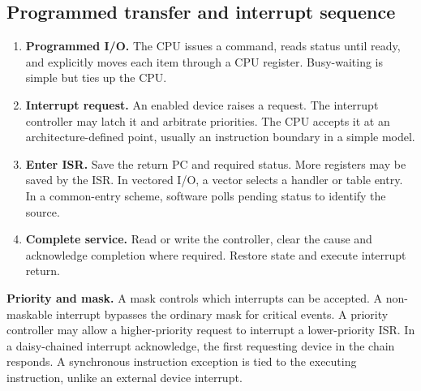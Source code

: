 \documentclass[12pt,a4paper]{article}
\begin{document}
\subsection{Programmed transfer and interrupt sequence}
\begin{enumerate}[leftmargin=*,itemsep=3pt]
\item \textbf{Programmed I/O.} The CPU issues a command, reads status until ready, and explicitly moves each item through a CPU register. Busy-waiting is simple but ties up the CPU.
\item \textbf{Interrupt request.} An enabled device raises a request. The interrupt controller may latch it and arbitrate priorities. The CPU accepts it at an architecture-defined point, usually an instruction boundary in a simple model.
\item \textbf{Enter ISR.} Save the return PC and required status. More registers may be saved by the ISR. In vectored I/O, a vector selects a handler or table entry. In a common-entry scheme, software polls pending status to identify the source.
\item \textbf{Complete service.} Read or write the controller, clear the cause and acknowledge completion where required. Restore state and execute interrupt return.
\end{enumerate}
\textbf{Priority and mask.} A mask controls which interrupts can be accepted. A non-maskable interrupt bypasses the ordinary mask for critical events. A priority controller may allow a higher-priority request to interrupt a lower-priority ISR. In a daisy-chained interrupt acknowledge, the first requesting device in the chain responds. A synchronous instruction exception is tied to the executing instruction, unlike an external device interrupt.

\begin{tcolorbox}[tikzbox,title={Daisy-chained interrupt acknowledgement},unbreakable]
\centering
{}
\end{tcolorbox}
\end{document}
